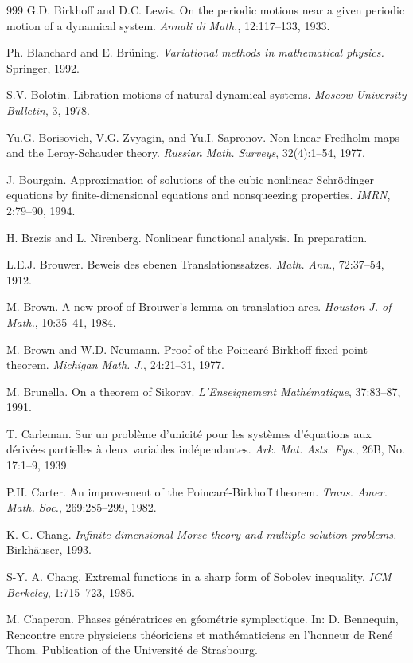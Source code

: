 \begin{thebibliography}{999}
 G.D. Birkhoff and D.C. Lewis. On the periodic motions near
a given periodic motion of a dynamical system. \emph{Annali di Math.},
12:117--133, 1933.

 Ph. Blanchard and E. Brüning. \emph{Variational methods in
mathematical physics.} Springer, 1992.

 S.V. Bolotin. Libration motions of natural dynamical systems.
\emph{Moscow University Bulletin}, 3, 1978.

 Yu.G. Borisovich, V.G. Zvyagin, and Yu.I. Sapronov.
Non-linear Fredholm maps and the Leray-Schauder theory.
\emph{Russian Math. Surveys}, 32(4):1--54, 1977.

 J. Bourgain. Approximation of solutions of the cubic
nonlinear Schrödinger equations by finite-dimensional equations and
nonsqueezing properties. \emph{IMRN}, 2:79--90, 1994.

 H. Brezis and L. Nirenberg. Nonlinear functional analysis.
In preparation.

 L.E.J. Brouwer. Beweis des ebenen Translationssatzes.
\emph{Math. Ann.}, 72:37--54, 1912.

 M. Brown. A new proof of Brouwer's lemma on translation arcs.
\emph{Houston J. of Math.}, 10:35--41, 1984.

 M. Brown and W.D. Neumann. Proof of the Poincaré-Birkhoff
fixed point theorem. \emph{Michigan Math. J.}, 24:21--31, 1977.

 M. Brunella. On a theorem of Sikorav.
\emph{L'Enseignement Mathématique}, 37:83--87, 1991.

 T. Carleman. Sur un problème d'unicité pour les systèmes
d'équations aux dérivées partielles à deux variables indépendantes.
\emph{Ark. Mat. Asts. Fys.}, 26B, No. 17:1--9, 1939.

 P.H. Carter. An improvement of the Poincaré-Birkhoff theorem.
\emph{Trans. Amer. Math. Soc.}, 269:285--299, 1982.

 K.-C. Chang. \emph{Infinite dimensional Morse theory and
multiple solution problems.} Birkhäuser, 1993.

 S-Y. A. Chang. Extremal functions in a sharp form of Sobolev
inequality. \emph{ICM Berkeley}, 1:715--723, 1986.

 M. Chaperon. Phases génératrices en géométrie symplectique.
In: D. Bennequin, Rencontre entre physiciens théoriciens et
mathématiciens en l'honneur de René Thom. Publication of the
Université de Strasbourg.


\end{thebibliography}
